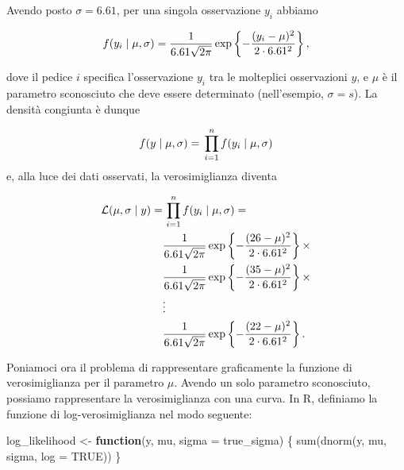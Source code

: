 \documentclass[
  11pt,
]{krantz}
\makeatletter
\newenvironment{Shaded}{\begin{snugshade}}{\end{snugshade}}
\newcommand{\AttributeTok}[1]{\textcolor[rgb]{0.61,0.61,0.61}{#1}}
\newcommand{\CommentTok}[1]{\textcolor[rgb]{0.37,0.37,0.37}{\textit{#1}}}
\newcommand{\ConstantTok}[1]{\textcolor[rgb]{0,0,0}{#1}}
\newcommand{\ControlFlowTok}[1]{\textcolor[rgb]{0.27,0.27,0.27}{\textbf{#1}}}
\newcommand{\FunctionTok}[1]{\textcolor[rgb]{0,0,0}{#1}}
\newcommand{\NormalTok}[1]{#1}
\newcommand{\OtherTok}[1]{\textcolor[rgb]{0.37,0.37,0.37}{#1}}
\newcommand{\SpecialCharTok}[1]{\textcolor[rgb]{0,0,0}{#1}}
\newenvironment{kframe}{%
\medskip{}
\setlength{\fboxsep}{.8em}
 \def\at@end@of@kframe{}%
 \ifinner\ifhmode%
  \def\at@end@of@kframe{\end{minipage}}%
  \begin{minipage}{\columnwidth}%
 \fi\fi%
 \def\FrameCommand##1{\hskip\@totalleftmargin \hskip-\fboxsep
 \colorbox{shadecolor}{##1}\hskip-\fboxsep
     \hskip-\linewidth \hskip-\@totalleftmargin \hskip\columnwidth}%
 \MakeFramed {\advance\hsize-\width
   \@totalleftmargin\z@ \linewidth\hsize
   \@setminipage}}%
 {\par\unskip\endMakeFramed%
 \at@end@of@kframe}
\renewenvironment{Shaded}{\begin{kframe}}{\end{kframe}}
\newcommand{\R}{\textsf{R}} %
\theoremstyle{definition}
\theoremstyle{definition}
\theoremstyle{definition}
\theoremstyle{definition}
\theoremstyle{remark}
\makeatother
\begin{document}
\begin{Shaded}
\end{Shaded}

Avendo posto \(\sigma = 6.61\), per una singola osservazione \(y_i\) abbiamo

\[
f(y_i \mid \mu, \sigma) = \frac{1}{{6.61 \sqrt {2\pi}}}\exp\left\{{-\frac{(y_i - \mu)^2}{2\cdot 6.61^2}}\right\},\notag
\]

dove il pedice \(i\) specifica l'osservazione \(y_i\) tra le molteplici osservazioni \(y\), e \(\mu\) è il parametro sconosciuto che deve essere determinato (nell'esempio, \(\sigma = s\)). La densità congiunta è dunque

\[
f(y \mid \mu, \sigma) = \, \prod_{i=1}^n f(y_i \mid \mu, \sigma)\notag
\] e, alla luce dei dati osservati, la verosimiglianza diventa

\[
\begin{aligned}
\mathcal{L}(\mu, \sigma \mid y) =& \, \prod_{i=1}^n f(y_i \mid \mu, \sigma) = \notag\\
& \frac{1}{{6.61 \sqrt {2\pi}}}\exp\left\{{-\frac{(26 - \mu)^2}{2\cdot 6.61^2}}\right\} \times \notag\\
 & \frac{1}{{6.61 \sqrt {2\pi}}}\exp\left\{{-\frac{(35 - \mu)^2}{2\cdot 6.61^2}}\right\} \times  \notag\\
& \vdots \notag\\
 & \frac{1}{{6.61 \sqrt {2\pi}}}\exp\left\{{-\frac{(22 - \mu)^2}{2\cdot 6.61^2}}\right\}.
\end{aligned}
\label{eq:lldepression}
\]

Poniamoci ora il problema di rappresentare graficamente la funzione di verosimiglianza per il parametro \(\mu\). Avendo un solo parametro sconosciuto, possiamo rappresentare la verosimiglianza con una curva. In \R, definiamo la funzione di log-verosimiglianza nel modo seguente:

\begin{Shaded}
\begin{Highlighting}[]
\NormalTok{log\_likelihood }\OtherTok{\textless{}{-}} \ControlFlowTok{function}\NormalTok{(y, mu, }\AttributeTok{sigma =}\NormalTok{ true\_sigma) \{}
  \FunctionTok{sum}\NormalTok{(}\FunctionTok{dnorm}\NormalTok{(y, mu, sigma, }\AttributeTok{log =} \ConstantTok{TRUE}\NormalTok{))}
\NormalTok{\}}
\end{Highlighting}
\end{Shaded}
\end{document}
